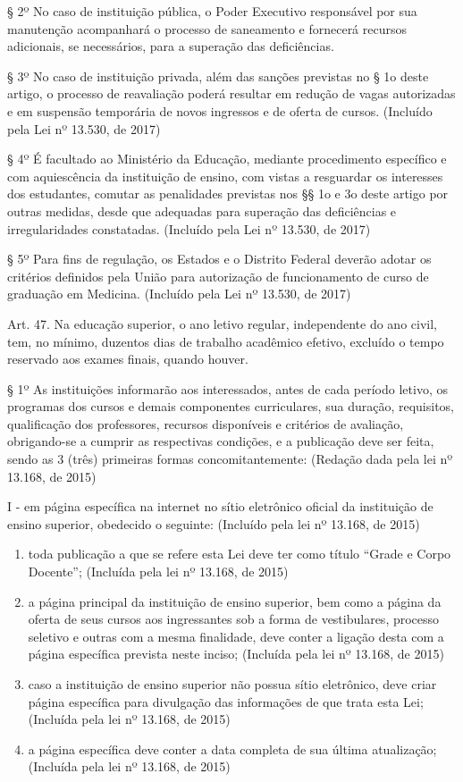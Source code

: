 \documentclass[
]{book}
\begin{document}
§ 2º No caso de instituição pública, o Poder Executivo responsável por sua manutenção acompanhará o processo de saneamento e fornecerá recursos adicionais, se necessários, para a superação das deficiências.

§ 3º No caso de instituição privada, além das sanções previstas no § 1o deste artigo, o processo de reavaliação poderá resultar em redução de vagas autorizadas e em suspensão temporária de novos ingressos e de oferta de cursos. (Incluído pela Lei nº 13.530, de 2017)

§ 4º É facultado ao Ministério da Educação, mediante procedimento específico e com aquiescência da instituição de ensino, com vistas a resguardar os interesses dos estudantes, comutar as penalidades previstas nos §§ 1o e 3o deste artigo por outras medidas, desde que adequadas para superação das deficiências e irregularidades constatadas. (Incluído pela Lei nº 13.530, de 2017)

§ 5º Para fins de regulação, os Estados e o Distrito Federal deverão adotar os critérios definidos pela União para autorização de funcionamento de curso de graduação em Medicina. (Incluído pela Lei nº 13.530, de 2017)

Art. 47. Na educação superior, o ano letivo regular, independente do ano civil, tem, no mínimo, duzentos dias de trabalho acadêmico efetivo, excluído o tempo reservado aos exames finais, quando houver.

§ 1º As instituições informarão aos interessados, antes de cada período letivo, os programas dos cursos e demais componentes curriculares, sua duração, requisitos, qualificação dos professores, recursos disponíveis e critérios de avaliação, obrigando-se a cumprir as respectivas condições, e a publicação deve ser feita, sendo as 3 (três) primeiras formas concomitantemente: (Redação dada pela lei nº 13.168, de 2015)

I - em página específica na internet no sítio eletrônico oficial da instituição de ensino superior, obedecido o seguinte: (Incluído pela lei nº 13.168, de 2015)

\begin{enumerate}
\def\labelenumi{\alph{enumi})}
\item
  toda publicação a que se refere esta Lei deve ter como título ``Grade e Corpo Docente''; (Incluída pela lei nº 13.168, de 2015)
\item
  a página principal da instituição de ensino superior, bem como a página da oferta de seus cursos aos ingressantes sob a forma de vestibulares, processo seletivo e outras com a mesma finalidade, deve conter a ligação desta com a página específica prevista neste inciso; (Incluída pela lei nº 13.168, de 2015)
\item
  caso a instituição de ensino superior não possua sítio eletrônico, deve criar página específica para divulgação das informações de que trata esta Lei; (Incluída pela lei nº 13.168, de 2015)
\item
  a página específica deve conter a data completa de sua última atualização; (Incluída pela lei nº 13.168, de 2015)
\end{enumerate}
\end{document}
